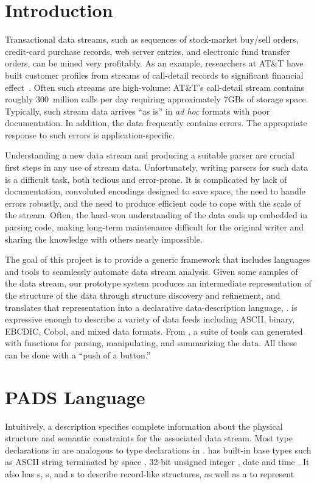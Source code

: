 \documentclass{article}
\begin{document}
\section{Introduction}
\label{intro}
Transactional data streams, such as sequences of stock-market buy/sell orders,
credit-card purchase records, web server entries, and electronic fund
transfer orders, can be mined very profitably.  As an example,
researchers at AT\&T have built customer profiles from streams of
call-detail records to significant financial effect~\cite{kdd99}.   
Often such streams are high-volume: AT\&T's call-detail stream contains
roughly 300~million calls per day requiring approximately 7GBs of
storage space.  Typically, such stream data arrives ``as is'' in
\textit{ad hoc} formats with poor documentation.  In addition, the
data frequently contains errors.  The appropriate response to such
errors is application-specific. 

Understanding a new data stream and producing a suitable parser are
crucial first steps in any use of stream data.  Unfortunately, writing
parsers for such data is a difficult task, both tedious and
error-prone. It is complicated by lack of documentation, convoluted
encodings designed to save space, the need to handle errors
robustly, and the need to produce efficient code to cope with the
scale of the stream.  Often, the hard-won understanding of the data
ends up embedded in parsing code, making long-term maintenance
difficult for the original writer and sharing the knowledge with
others nearly impossible.

The goal of this project is to provide a generic framework that includes
languages and tools to seamlessly automate data stream analysis. 
Given some samples of the data stream, our prototype system produces 
an intermediate
representation of the structure of the data through structure discovery
and refinement, and translates that representation into a
declarative data-description language, \padsc{}. \padsc{} is 
expressive enough to describe a variety of data feeds 
including ASCII, binary, EBCDIC, Cobol, and mixed data formats.  
From \padsc{}, a suite of tools can generated with functions for 
parsing, manipulating, and summarizing the data. All these can be 
done with a ``push of a button.''   

\section{PADS Language}
Intuitively, a \padsc{} description specifies complete information
about the physical structure and semantic constraints for the associated
data stream. Most type declarations in \padsc{} are analogous to type
declarations in \C{}. \padsc{} has built-in base types such as
ASCII string terminated by space ,
32-bit unsigned integer , date  and time .
It also has s, s, and s to describe
record-like structures, as well as a  to represent
\end{document}
